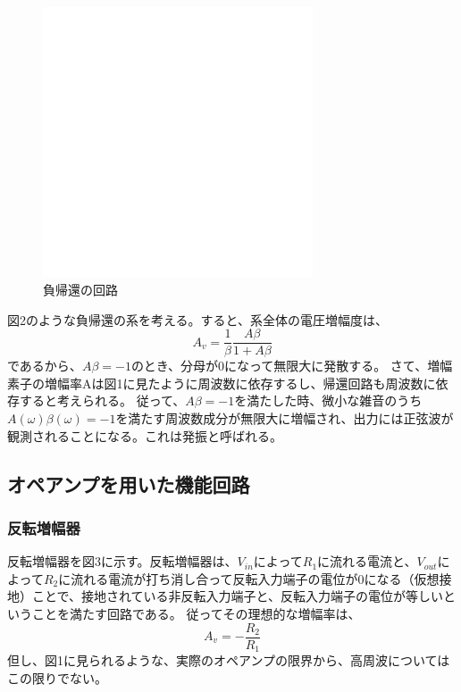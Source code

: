 \documentclass[10pt,a4j,dvipdfmx]{jsarticle}
\makeatletter
\let\@oldsubsec\subsection
\renewcommand{\subsection}[1]{\vspace{-7pt}\@oldsubsec{#1}}
\makeatother
\begin{document}
\begin{figure}[H]
  \centering
  \includegraphics[width=8cm]{token.png}
  \caption{負帰還の回路}
\end{figure}

図2のような負帰還の系を考える。すると、系全体の電圧増幅度は、
\begin{equation}
A_v = \frac{1}{\beta}\frac{A\beta}{1+A\beta}
\end{equation}
であるから、$A\beta = -1$のとき、分母が0になって無限大に発散する。
さて、増幅素子の増幅率Aは図1に見たように周波数に依存するし、帰還回路も周波数に依存すると考えられる。
従って、$A\beta = -1$を満たした時、微小な雑音のうち$A(\omega)\beta(\omega) = -1$を満たす周波数成分が無限大に増幅され、出力には正弦波が観測されることになる。これは発振と呼ばれる。

\subsection{オペアンプを用いた機能回路}

\subsubsection{反転増幅器}
反転増幅器を図3に示す。反転増幅器は、$V_{in}$によって$R_1$に流れる電流と、$V_{out}$によって$R_2$に流れる電流が打ち消し合って反転入力端子の電位が0になる（仮想接地）ことで、接地されている非反転入力端子と、反転入力端子の電位が等しいということを満たす回路である。
従ってその理想的な増幅率は、
\begin{equation}
A_v = -\frac{R_2}{R_1}
\end{equation}
但し、図1に見られるような、実際のオペアンプの限界から、高周波についてはこの限りでない。
\end{document}
